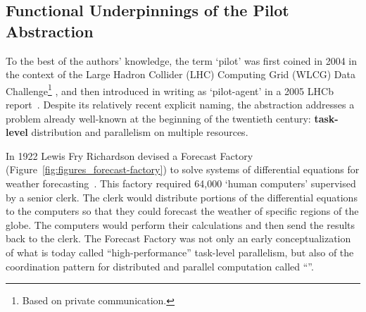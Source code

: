 \documentclass{sig-alternate}
\begin{document}

  


\subsection{Functional Underpinnings of the Pilot Abstraction}
\label{sec:histabstr}

To the best of the authors' knowledge, the term `pilot' was first coined in 2004
in the context of the Large Hadron Collider (LHC) Computing Grid (WLCG) Data
Challenge\footnote{Based on private communication.}
\cite{lhc_url,lhc1995large,wlcg_url,bonacorsi2007wlcg}, and then introduced in
writing as `pilot-agent' in a 2005 LHCb report~\cite{nobrega2005lhcb,lhcb_url}.
Despite its relatively recent explicit naming, the \pilot abstraction addresses
a problem already well-known at the beginning of the twentieth century: {\bf
task-level} distribution and parallelism on multiple resources.

In 1922 Lewis Fry Richardson devised a Forecast
Factory~\cite{lynch1999richardson} (Figure~\ref{fig:figures_forecast-factory})
to solve systems of differential equations for weather
forecasting~\cite{richardson1922weather}. This factory required 64,000 `human
computers' supervised by a senior clerk. The clerk would distribute portions of
the differential equations to the computers so that they could forecast the
weather of specific regions of the globe. The computers would perform their
calculations and then send the results back to the clerk. The Forecast Factory
was not only an early conceptualization of what is today called
``high-performance'' task-level parallelism, but also of the coordination
pattern for distributed and parallel computation called ``\MW''.
\end{document}
